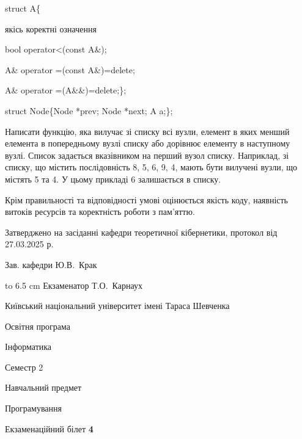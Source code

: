 \documentclass[12pt, ukrainian]{article}
\begin{document}
{struct A\{

\quad  якісь коректні означення 

\quad  bool operator<(const A\&); 

\quad A\& operator =(const A\&)=delete; 

\quad  A\& operator =(A\&\&)=delete;\};

struct Node\{Node *prev; Node *next; A a;\};

Написати функцію, яка вилучає зі списку всі вузли, елемент в яких менший елемента в попередньому вузлі списку або дорівнює елементу в наступному вузлі. Список задається вказівником на перший вузол списку. Наприклад, зі списку, що містить послідовність 8, 5, 6, 9, 4, мають бути вилучені вузли, що містять 5 та 4. У цьому прикладі 6 залишається в списку.

Крім правильності та відповідності умові оцінюється якість коду, наявність витоків ресурсів та коректність роботи з пам'яттю. 

}
{\smallskip\smallskip \begin {scriptsize} Затверджено на засіданні кафедри теоретичної кібернетики, протокол   від   27.03.2025 р.\par\smallskip\smallskip\smallskip\smallskip
{\parbox {6.5 cm} {Зав. кафедри \dotfill Ю.В.~Крак}}\hspace {0.7cm} {\hbox to 6.5 cm { Екзаменатор \dotfill Т.О.~Карнаух}} \end{scriptsize}}
\newpage
{{\begin {scriptsize}\par
{ \center  Київський національний університет імені Тараса Шевченка \par}
{\parbox {5 cm}{Освітня програма \hfill}{\parbox {7 cm}{Інформатика\hfill}}\parbox {6 cm}{\hfill Семестр 2}}\par
{\parbox {5 cm} {Навчальний предмет \hfill}\parbox {7 cm}{Програмування \hfill}\parbox {6cm}{\hfill}\par}\vspace{-15pt} \end{scriptsize}}{\center Екзаменаційний білет \No \textbf { 4 }\par}}
\end{document}
